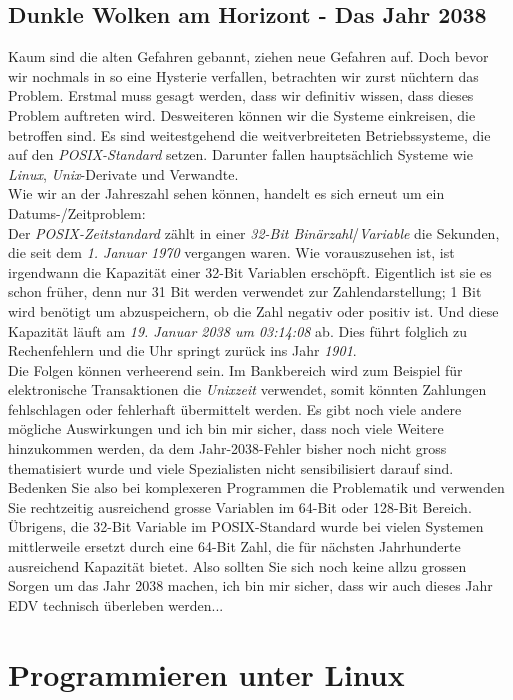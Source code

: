 \documentclass[b5paper,10pt,dvips,fleqn,titlepage,twoside]{book}
\begin{document}
\section{Dunkle Wolken am Horizont - Das Jahr 2038}
Kaum sind die alten Gefahren gebannt, ziehen neue Gefahren auf. Doch bevor wir nochmals in so eine Hysterie verfallen, betrachten wir zurst nüchtern das Problem.
Erstmal muss gesagt werden, dass wir definitiv wissen, dass dieses Problem auftreten wird. Desweiteren können wir die Systeme einkreisen, die betroffen sind. Es sind weitestgehend die weitverbreiteten Betriebssysteme, die auf den \emph{POSIX-Standard} setzen. Darunter fallen hauptsächlich Systeme wie \emph{Linux}, \emph{Unix}-Derivate und Verwandte.\\
Wie wir an der Jahreszahl sehen können, handelt es sich erneut um ein Datums-/Zeitproblem:\\
Der \emph{POSIX-Zeitstandard} zählt in einer \emph{32-Bit Binärzahl}/\emph{Variable} die Sekunden, die seit dem \textit{1. Januar 1970} vergangen waren. Wie vorauszusehen ist, ist irgendwann die Kapazität einer 32-Bit Variablen erschöpft. Eigentlich ist sie es schon früher, denn nur 31 Bit werden verwendet zur Zahlendarstellung; 1 Bit wird benötigt um abzuspeichern, ob die Zahl negativ oder positiv ist. Und diese Kapazität läuft am \textit{19. Januar 2038 um 03:14:08} ab. Dies führt folglich zu Rechenfehlern und die Uhr springt zurück ins Jahr \emph{1901}.\\
Die Folgen können verheerend sein. Im Bankbereich wird zum Beispiel für elektronische Transaktionen die \emph{Unixzeit} verwendet, somit könnten Zahlungen fehlschlagen oder fehlerhaft übermittelt werden. Es gibt noch viele andere mögliche Auswirkungen und ich bin mir sicher, dass noch viele Weitere hinzukommen werden, da dem Jahr-2038-Fehler bisher noch nicht gross thematisiert wurde und viele Spezialisten nicht sensibilisiert darauf sind. Bedenken Sie also bei komplexeren Programmen die Problematik und verwenden Sie rechtzeitig ausreichend grosse Variablen im 64-Bit oder 128-Bit Bereich.\\
Übrigens, die 32-Bit Variable im POSIX-Standard wurde bei vielen Systemen mittlerweile ersetzt durch eine 64-Bit Zahl, die für nächsten Jahrhunderte ausreichend Kapazität bietet. Also sollten Sie sich noch keine allzu grossen Sorgen um das Jahr 2038 machen, ich bin mir sicher, dass wir auch dieses Jahr EDV technisch überleben werden...

\chapter{Programmieren unter Linux}
\end{document}
